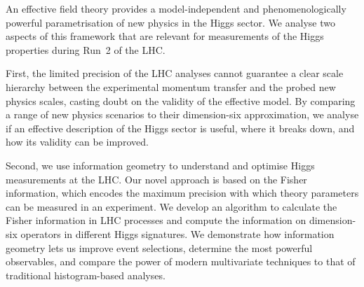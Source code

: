 An effective field theory provides a model-independent and
phenomenologically powerful parametrisation of new physics in the
Higgs sector. We analyse two aspects of this framework that are
relevant for measurements of the Higgs properties during Run~2 of the
LHC.

First, the limited precision of the LHC analyses cannot guarantee a
clear scale hierarchy between the experimental momentum transfer and
the probed new physics scales, casting doubt on the validity of the
effective model. By comparing a range of new physics scenarios to
their dimension-six approximation, we analyse if an effective
description of the Higgs sector is useful, where it breaks down, and
how its validity can be improved.

Second, we use information geometry to understand and optimise Higgs
measurements at the LHC. Our novel approach is based on the Fisher
information, which encodes the maximum precision with which theory
parameters can be measured in an experiment. We develop an algorithm
to calculate the Fisher information in LHC processes and compute the
information on dimension-six operators in different Higgs signatures.
We demonstrate how information geometry lets us improve event
selections, determine the most powerful observables, and compare the
power of modern multivariate techniques to that of traditional
histogram-based analyses.



